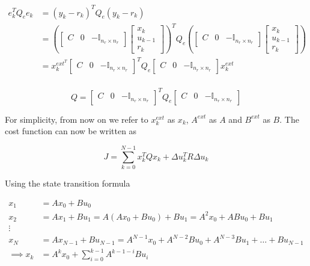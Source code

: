 \documentclass{article}
\begin{document}
$$
\begin{aligned}
  e_k^T Q_e e_k &= (y_k - r_k)^T Q_e (y_k - r_k) \\
  &= \left(
    \begin{bmatrix} C & 0 & -\mathbb{I}_{n_r \times n_r}
    \end{bmatrix}
    \begin{bmatrix}
      x_k \\
      u_{k-1} \\
      r_k
  \end{bmatrix}\right)^T Q_e
  \left(
    \begin{bmatrix} C & 0 & -\mathbb{I}_{n_r \times n_r}
    \end{bmatrix}
    \begin{bmatrix}
      x_k \\
      u_{k-1} \\
      r_k
  \end{bmatrix}\right) \\
  &= x_k^{ext^T}
  \begin{bmatrix} C & 0 & -\mathbb{I}_{n_r \times n_r}
  \end{bmatrix}^T Q_e
  \begin{bmatrix} C & 0 & -\mathbb{I}_{n_r \times n_r}
  \end{bmatrix} x_k^{ext} \\
\end{aligned}
$$

\begin{equation}
  Q =
  \begin{bmatrix} C & 0 & -\mathbb{I}_{n_r \times n_r}
  \end{bmatrix}^T Q_e
  \begin{bmatrix} C & 0 & -\mathbb{I}_{n_r \times n_r}
  \end{bmatrix}
\end{equation}

For simplicity, from now on we refer to $x_k^{ext}$ as $x_k$, $A^{ext}$ as $A$ and $B^{ext}$ as $B$.
The cost function can now be written as

$$
J = \sum_{k=0}^{N-1} x_k^T Q x_k + \Delta u_k^T R \Delta u_k
$$

Using the state transition formula

$$
\begin{aligned}
  x_1 &= A x_0 + B u_0 \\
  x_2 &= A x_1 + B u_1 = A(A x_0 + B u_0) + B u_1 = A^2 x_0 + A B u_0 + B u_1 \\
  \vdots \\
  x_N &= A x_{N-1} + B u_{N-1} = A^{N-1} x_0 + A^{N-2} B u_0 + A^{N-3} B u_1 + \ldots + B u_{N-1} \\
  \implies x_k &= A^k x_0 + \sum_{i=0}^{k-1} A^{k-1-i} B u_i
\end{aligned}
$$
\end{document}
